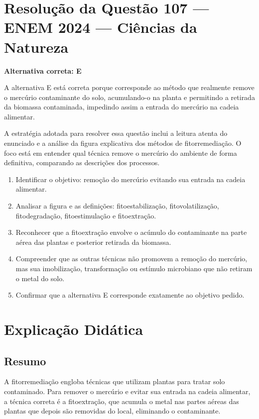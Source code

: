 \documentclass{article}
\begin{document}
\section*{Resolução da Questão 107 --- ENEM 2024 --- Ciências da Natureza}

\textbf{Alternativa correta: E}

A alternativa E está correta porque corresponde ao método que realmente remove o mercúrio contaminante do solo, acumulando-o na planta e permitindo a retirada da biomassa contaminada, impedindo assim a entrada do mercúrio na cadeia alimentar.

A estratégia adotada para resolver essa questão inclui a leitura atenta do enunciado e a análise da figura explicativa dos métodos de fitorremediação. O foco está em entender qual técnica remove o mercúrio do ambiente de forma definitiva, comparando as descrições dos processos.

\begin{enumerate}
  \item Identificar o objetivo: remoção do mercúrio evitando sua entrada na cadeia alimentar.
  \item Analisar a figura e as definições: fitoestabilização, fitovolatilização, fitodegradação, fitoestimulação e fitoextração.
  \item Reconhecer que a fitoextração envolve o acúmulo do contaminante na parte aérea das plantas e posterior retirada da biomassa.
  \item Compreender que as outras técnicas não promovem a remoção do mercúrio, mas sua imobilização, transformação ou estímulo microbiano que não retiram o metal do solo.
  \item Confirmar que a alternativa E corresponde exatamente ao objetivo pedido.
\end{enumerate}

\section*{Explicação Didática}

\subsection*{Resumo}
A fitorremediação engloba técnicas que utilizam plantas para tratar solo contaminado. Para remover o mercúrio e evitar sua entrada na cadeia alimentar, a técnica correta é a fitoextração, que acumula o metal nas partes aéreas das plantas que depois são removidas do local, eliminando o contaminante.
\end{document}
